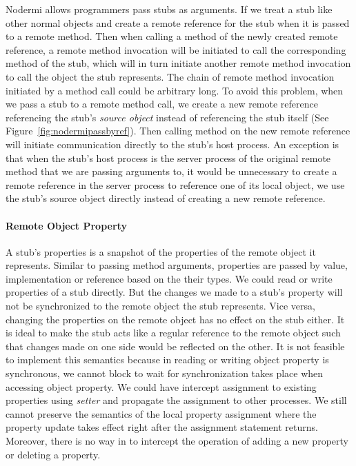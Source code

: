 Nodermi allows programmers pass stubs as arguments.
If we treat a stub like other normal objects and create a remote reference 
 for the stub when it is passed to a remote method. 
Then when calling a method of the newly created remote reference,
a remote method invocation will be initiated to call the corresponding method
of the stub, which will in turn initiate another remote method invocation
to call the object the stub represents.
The chain of remote method invocation initiated by a method call could
be arbitrary long.
To avoid this problem, when we pass a stub to a remote method call,
we create a new remote reference referencing 
 the stub's \emph{source object} instead of referencing the stub itself
 (See Figure~\ref{fig:nodermipassbyref}).
Then calling method on the new remote reference will initiate 
communication directly to the stub's host process.
An exception is that when the stub's host process is the server
process of the original remote method that we are passing arguments to,
it would be unnecessary to create a remote reference 
in the server process to reference one of its local object,
we use the stub's source object directly instead of 
creating a new remote reference.


\paragraph{Remote Object Property}
A stub's properties is a snapshot of the properties
of the remote object it represents.
Similar to passing method arguments,
properties are passed by value, implementation or reference
based on the their types.
We could read or write properties of a stub directly.
But the changes we made to a stub's property
will not be synchronized to the remote object the stub represents.
Vice versa,
changing the properties on the remote object has no effect
on the stub either.
It is ideal to make the stub acts like a regular reference
to the remote object such that
changes made on one side would be reflected on the other.
It is not feasible to implement this semantics because
in \js{} reading or writing object property is synchronous,
we cannot block to wait for synchronization takes place
 when accessing object property.
We could have intercept assignment to existing properties using
\emph{setter} and propagate the assignment to other processes.
We still cannot preserve the semantics of the local property assignment
where the property update takes effect right after the assignment statement returns.
Moreover, there is no way in \js{} to intercept the operation of
adding a new property or deleting a property.



